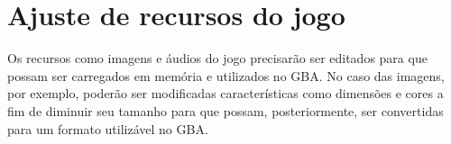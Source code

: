 \section{Ajuste de recursos do jogo}

Os recursos como imagens e áudios do jogo precisarão ser editados para que possam ser carregados em memória e utilizados no GBA. No caso das imagens, por exemplo, poderão ser modificadas características como dimensões e cores a fim de diminuir seu tamanho para que possam, posteriormente, ser convertidas para um formato utilizável no GBA.
